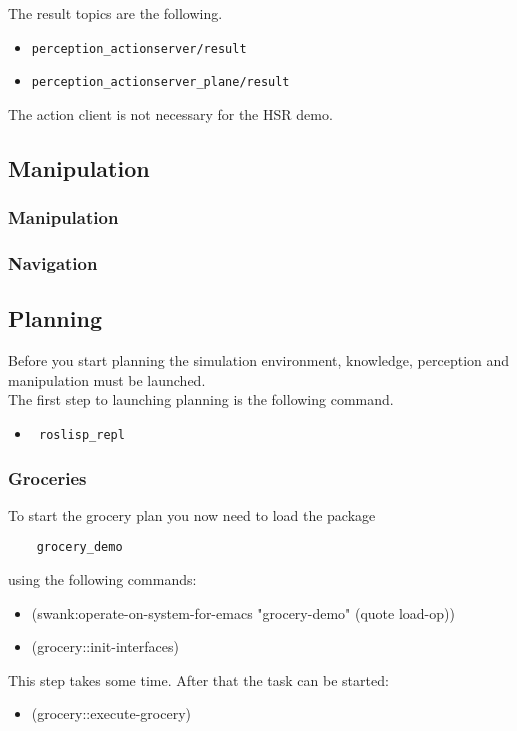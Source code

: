 \documentclass[main.tex]{subfiles}
\begin{document}
The result topics are the following.
\begin{itemize}
\item \begin{verbatim}
perception_actionserver/result
\end{verbatim}
\item \begin{verbatim}
perception_actionserver_plane/result
\end{verbatim}
\end{itemize}

The action client is not necessary for the HSR demo.
	
	\subsection{Manipulation}
	\subsubsection{Manipulation}
	
	\subsubsection{Navigation}
	
	\subsection{Planning}
	Before you start planning the simulation environment, knowledge, perception and manipulation must be launched.\\
	The first step to launching planning is the following command.
	\begin{itemize}
\item \begin{verbatim} roslisp_repl \end{verbatim} 
\end{itemize}
	\subsubsection{Groceries}
	To start the grocery plan you now need to load the package \begin{verbatim}
	grocery_demo
	\end{verbatim}
	 using the following commands:
	\begin{itemize}
\item (swank:operate-on-system-for-emacs "grocery-demo" (quote load-op))
\item (grocery::init-interfaces)
\end{itemize}
This step takes some time. After that the task can be started:
\begin{itemize}
\item (grocery::execute-grocery)
\end{itemize}
\end{document}
